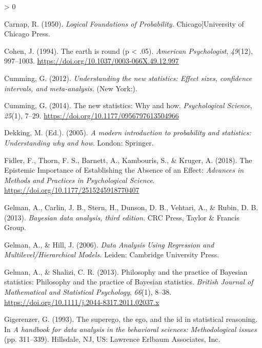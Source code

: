 \documentclass[
  a4paper,11pt,twoside,onecolumn,openright,final,oldfontcommands]{memoir}
\newlength{\cslhangindent}
\newenvironment{CSLReferences}[2] %
 {%
  \setlength{\parindent}{0pt}
  \ifodd #1 \everypar{\setlength{\hangindent}{\cslhangindent}}\ignorespaces\fi
  \ifnum #2 > 0
  \setlength{\parskip}{#2\baselineskip}
  \fi
 }%
 {}
\theoremstyle{definition}
\theoremstyle{definition}
\theoremstyle{definition}
\theoremstyle{remark}
\begin{document}
\begin{CSLReferences}{1}{0}
\leavevmode\hypertarget{ref-carnap_logical_1950}{}%
Carnap, R. (1950). \emph{Logical {Foundations} of {Probability}}. Chicago{]}University of Chicago Press.

\leavevmode\hypertarget{ref-cohen_earth_1994}{}%
Cohen, J. (1994). The earth is round (p {\textless{}} .05). \emph{American Psychologist}, \emph{49}(12), 997--1003. \url{https://doi.org/10.1037/0003-066X.49.12.997}

\leavevmode\hypertarget{ref-Cumming2012}{}%
Cumming, G. (2012). \emph{Understanding the new statistics: {Effect} sizes, confidence intervals, and meta-analysis.} (New York:).

\leavevmode\hypertarget{ref-cumming_new_2014}{}%
Cumming, G. (2014). The new statistics: {Why} and how. \emph{Psychological Science}, \emph{25}(1), 7--29. \url{https://doi.org/10.1177/0956797613504966}

\leavevmode\hypertarget{ref-dekking_modern_2005}{}%
Dekking, M. (Ed.). (2005). \emph{A modern introduction to probability and statistics: Understanding why and how}. London: Springer.

\leavevmode\hypertarget{ref-fidler_epistemic_2018}{}%
Fidler, F., Thorn, F. S., Barnett, A., Kambouris, S., \& Kruger, A. (2018). The {Epistemic} {Importance} of {Establishing} the {Absence} of an {Effect}: \emph{Advances in Methods and Practices in Psychological Science}. \url{https://doi.org/10.1177/2515245918770407}

\leavevmode\hypertarget{ref-gelman_bayesian_2013}{}%
Gelman, A., Carlin, J. B., Stern, H., Dunson, D. B., Vehtari, A., \& Rubin, D. B. (2013). \emph{Bayesian data analysis, third edition}. CRC Press, Taylor \& Francis Group.

\leavevmode\hypertarget{ref-gelman_data_2006}{}%
Gelman, A., \& Hill, J. (2006). \emph{Data {Analysis} {Using} {Regression} and {Multilevel}/{Hierarchical} {Models}.} Leiden: Cambridge University Press.

\leavevmode\hypertarget{ref-gelman_philosophy_2013}{}%
Gelman, A., \& Shalizi, C. R. (2013). Philosophy and the practice of {Bayesian} statistics: {Philosophy} and the practice of {Bayesian} statistics. \emph{British Journal of Mathematical and Statistical Psychology}, \emph{66}(1), 8--38. \url{https://doi.org/10.1111/j.2044-8317.2011.02037.x}

\leavevmode\hypertarget{ref-gigerenzer_superego_1993}{}%
Gigerenzer, G. (1993). The superego, the ego, and the id in statistical reasoning. In \emph{A handbook for data analysis in the behavioral sciences: {Methodological} issues} (pp. 311--339). Hillsdale, NJ, US: Lawrence Erlbaum Associates, Inc.


\end{CSLReferences}
\end{document}
